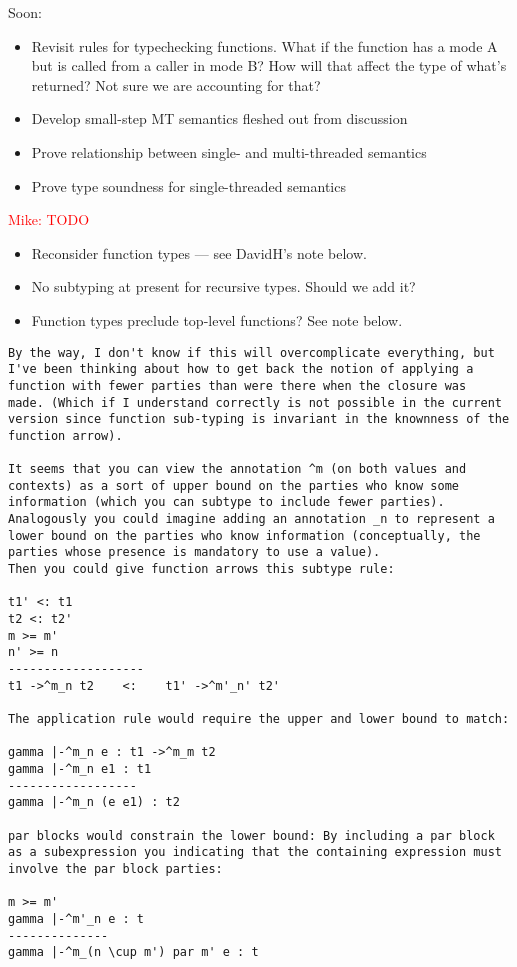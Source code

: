 \documentclass[10pt]{article}
\newcommand{\mwh}[1]{\textcolor{red}{Mike: #1}}
\begin{document}
Soon:
\begin{itemize}
\item Revisit rules for typechecking functions. What if the function
  has a mode A but is called from a caller in mode B? How will that
  affect the type of what's returned? Not sure we are accounting for
  that? 
\item Develop small-step MT semantics fleshed out from discussion
\item Prove relationship between single- and multi-threaded semantics
\item Prove type soundness for single-threaded semantics
\end{itemize}
\mwh{TODO}
\begin{itemize}
\item Reconsider function types --- see DavidH's note below.
\item No subtyping at present for recursive types. Should we add it?
\item Function types preclude top-level functions? See note below.
\end{itemize}

\begin{verbatim}
By the way, I don't know if this will overcomplicate everything, but
I've been thinking about how to get back the notion of applying a
function with fewer parties than were there when the closure was
made. (Which if I understand correctly is not possible in the current
version since function sub-typing is invariant in the knownness of the
function arrow). 

It seems that you can view the annotation ^m (on both values and
contexts) as a sort of upper bound on the parties who know some
information (which you can subtype to include fewer parties). 
Analogously you could imagine adding an annotation _n to represent a
lower bound on the parties who know information (conceptually, the
parties whose presence is mandatory to use a value). 
Then you could give function arrows this subtype rule:

t1' <: t1
t2 <: t2'
m >= m'
n' >= n
-------------------
t1 ->^m_n t2    <:    t1' ->^m'_n' t2'

The application rule would require the upper and lower bound to match: 

gamma |-^m_n e : t1 ->^m_m t2
gamma |-^m_n e1 : t1
------------------
gamma |-^m_n (e e1) : t2

par blocks would constrain the lower bound: By including a par block
as a subexpression you indicating that the containing expression must
involve the par block parties: 

m >= m'
gamma |-^m'_n e : t
--------------
gamma |-^m_(n \cup m') par m' e : t
\end{verbatim}



  
\end{document}
